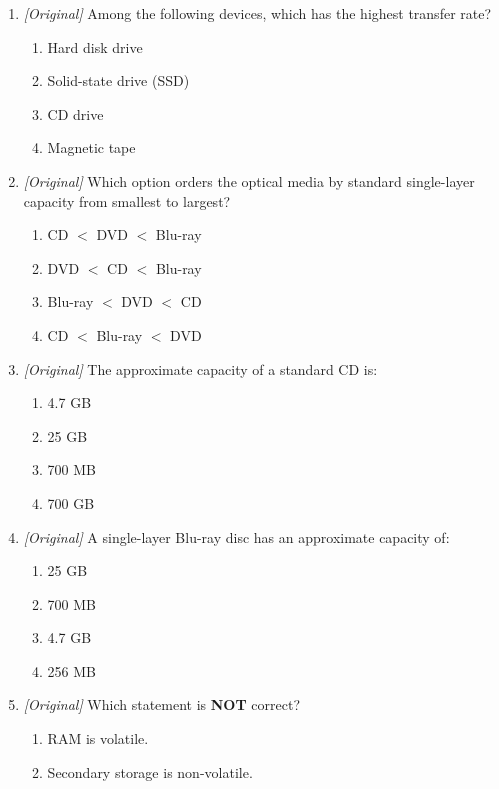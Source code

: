 \documentclass[11pt]{article}
\begin{document}
\begin{enumerate}[label=\textbf{Q\arabic*.}, leftmargin=*]
\begin{enumerate}[label=\Alph*.]
    \item RAM
    \item Hard disk
    \item SSD
  \end{enumerate}
\item \textit{[Original]} Among the following devices, which has the highest
  transfer rate?
  \begin{enumerate}[label=\Alph*.]
    \item Hard disk drive
    \item Solid-state drive (SSD)
    \item CD drive
    \item Magnetic tape
  \end{enumerate}
\item \textit{[Original]} Which option orders the optical media by standard
  single-layer capacity from smallest to largest?
  \begin{enumerate}[label=\Alph*.]
    \item CD $<$ DVD $<$ Blu-ray
    \item DVD $<$ CD $<$ Blu-ray
    \item Blu-ray $<$ DVD $<$ CD
    \item CD $<$ Blu-ray $<$ DVD
  \end{enumerate}
\item \textit{[Original]} The approximate capacity of a standard CD is:
  \begin{enumerate}[label=\Alph*.]
    \item 4.7 GB
    \item 25 GB
    \item 700 MB
    \item 700 GB
  \end{enumerate}
\item \textit{[Original]} A single-layer Blu-ray disc has an approximate
  capacity of:
  \begin{enumerate}[label=\Alph*.]
    \item 25 GB
    \item 700 MB
    \item 4.7 GB
    \item 256 MB
  \end{enumerate}
\item \textit{[Original]} Which statement is \textbf{NOT} correct?
  \begin{enumerate}[label=\Alph*.]
    \item RAM is volatile.
    \item Secondary storage is non-volatile.

\end{enumerate}
\end{enumerate}
\end{document}
